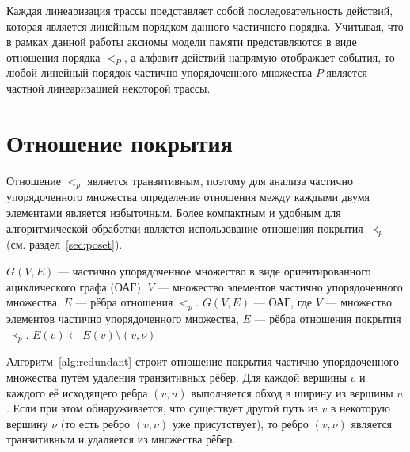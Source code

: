 Каждая линеаризация трассы представляет собой последовательность
действий, которая является линейным порядком данного частичного порядка.
Учитывая, что в рамках данной работы аксиомы модели памяти
представляются в виде отношения порядка $<_P$, а алфавит действий
напрямую отображает события, то любой линейный порядок частично
упорядоченного множества $P$ является частной линеаризацией некоторой трассы.

\section{Отношение покрытия}
\label{sec:rel-cov}

Отношение $<_p$ является транзитивным, поэтому для анализа частично
упорядоченного множества определение отношения между каждыми двумя
элементами является избыточным. Более компактным и удобным для
алгоритмической обработки является использование отношения покрытия
$\prec_p$ (см. раздел~\ref{sec:poset}).

\begin{algorithm}[H]
  \caption{Построение отношения покрытия частично упорядоченного множества}
  \label{alg:redundant}
  \begin{algorithmic}[1]

    \Require $G(V, E)$ — частично упорядоченное множество в виде
    ориентированного ациклического графа (ОАГ).
    \Require $V$ — множество элементов частично упорядоченного множества.
    \Require $E$ — рёбра отношения $<_p$.
    \Ensure
    $G(V, E)$ — ОАГ,
    где $V$ — множество элементов частично упорядоченного множества,
    $E$ — рёбра отношения покрытия $\prec_p$.
    \State $E(v) \gets E(v) \setminus (v, \nu)$
    \EndIf
    \EndFor
    \EndFor
    \EndFor
  \end{algorithmic}
\end{algorithm}

Алгоритм~\ref{alg:redundant} строит отношение покрытия частично
упорядоченного множества путём удаления транзитивных рёбер. Для
каждой вершины $v$ и каждого её исходящего ребра $(v, u)$ выполняется
обход в ширину из вершины $u$. Если при этом обнаруживается, что
существует другой путь из $v$ в некоторую вершину $\nu$ (то есть
ребро $(v, \nu)$ уже присутствует), то ребро $(v, \nu)$ является
транзитивным и удаляется из множества рёбер.

